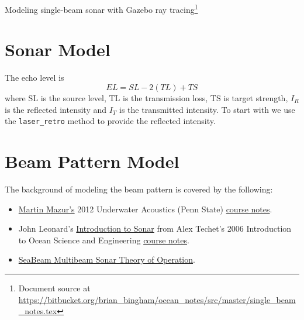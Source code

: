 \documentclass[11pt]{article}
\newcommand{\doctitle}{Modeling single-beam sonar with Gazebo ray tracing}
\begin{document}
\setlength{\IEEEnormaljot}{10pt}%


\newcommand{\SF}{0.7}
\newcommand{\SFb}{0.45}
\newcommand{\SFPic}{0.45}
\newcommand{\SFPlot}{0.45}
\newcommand{\SFc}{0.52}
\newcommand{\FigWidth}{\SF}


\newpage
\setcounter{page}{1}
\begin{center}
{\huge \doctitle}\footnote{Document source at \url{https://bitbucket.org/brian_bingham/ocean_notes/src/master/single_beam_notes.tex}}
\end{center}


\section{Sonar Model}

The echo level is
\[
EL = SL - 2(TL)+ TS %
\]
where SL is the source level, TL is the transmission loss, TS is target strength, $I_R$ is the reflected intensity and $I_T$ is the transmitted intensity.  To start with we use the \verb+laser_retro+ method to provide the reflected intensity.

\section{Beam Pattern Model}

The background of modeling the beam pattern is covered by the following:
\begin{itemize}
\item \href{http://www.personal.psu.edu/faculty/m/x/mxm14/}{Martin Mazur's} 2012 Underwater Acoustics (Penn State) \href{http://www.personal.psu.edu/faculty/m/x/mxm14/sonar/Mazur-sonar_signal_processing_combined.pdf}{course notes}.
\item John Leonard's \href{https://ocw.mit.edu/courses/mechanical-engineering/2-011-introduction-to-ocean-science-and-engineering-spring-2006/readings/hw5_sonar_leonar.pdf}{Introduction to Sonar} from Alex Techet's 2006 Introduction to Ocean Science and Engineering \href{https://ocw.mit.edu/courses/mechanical-engineering/2-011-introduction-to-ocean-science-and-engineering-spring-2006/}{course notes}.
\item \href{https://www3.mbari.org/data/mbsystem/sonarfunction/SeaBeamMultibeamTheoryOperation.pdf}{SeaBeam Multibeam Sonar Theory of Operation}.
\end{itemize}
\end{document}
